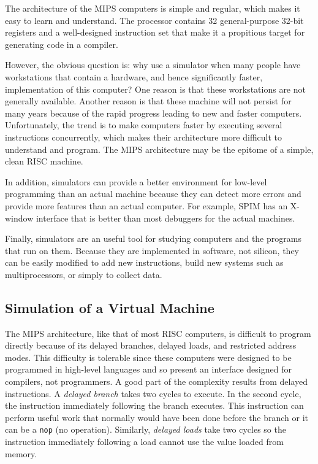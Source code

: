 \documentclass[11pt]{article}
\begin{document}
The architecture of the MIPS computers is simple and regular, which
makes it easy to learn and understand.  The processor contains 32
general-purpose 32-bit registers and a well-designed instruction set that
make it a propitious target for generating code in a compiler.

However, the obvious question is: why use a simulator when many people
have workstations that contain a hardware, and hence significantly
faster, implementation of this computer?  One reason is that these
workstations are not generally available.  Another reason is that
these machine will not persist for many years because of the rapid
progress leading to new and faster computers.  Unfortunately, the
trend is to make computers faster by executing several instructions
concurrently, which makes their architecture more difficult to
understand and program.  The MIPS architecture may be the epitome of a
simple, clean RISC machine.

In addition, simulators can provide a better environment for low-level
programming than an actual machine because they can detect more errors
and provide more features than an actual computer.  For example, SPIM
has an X-window interface that is better than most debuggers for the
actual machines.

Finally, simulators are an useful tool for studying computers and the
programs that run on them.  Because they are implemented in software,
not silicon, they can be easily modified to add new instructions,
build new systems such as multiprocessors, or simply to collect data.

\subsection{Simulation of a Virtual Machine}

The MIPS architecture, like that of most RISC computers, is difficult
to program directly because of its delayed branches, delayed loads,
and restricted address modes.  This difficulty is tolerable since
these computers were designed to be programmed in high-level languages
and so present an interface designed for compilers, not programmers.
A good part of the complexity results from delayed instructions.  A
{\em delayed branch\/} takes two cycles to execute.  In the second
cycle, the instruction immediately following the branch executes.
This instruction can perform useful work that normally would have been
done before the branch or it can be a {\tt nop} (no operation).
Similarly, {\em delayed loads\/} take two cycles so the instruction
immediately following a load cannot use the value loaded from memory.
\end{document}
